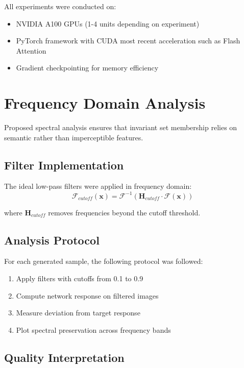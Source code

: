 \documentclass[licencjacka,en]{pracamgr}
\begin{document}
All experiments were conducted on:
\begin{itemize}
\item NVIDIA A100 GPUs (1-4 units depending on experiment)
\item PyTorch framework with CUDA most recent  acceleration such as Flash Attention \citep{dao2022flashattention, dao2023flashattention2}
\item Gradient checkpointing for memory efficiency
\end{itemize}

\section{Frequency Domain Analysis}\label{appendix:frequency_analysis}

Proposed spectral analysis ensures that invariant set membership relies on semantic rather than imperceptible features.

\subsection{Filter Implementation}

The ideal low-pass filters were applied in frequency domain:
\begin{equation}
\mathcal{F}_{cutoff}(\mathbf{x}) = \mathcal{F}^{-1}(\mathbf{H}_{cutoff} \cdot \mathcal{F}(\mathbf{x}))
\end{equation}

where $\mathbf{H}_{cutoff}$ removes frequencies beyond the cutoff threshold.

\subsection{Analysis Protocol}

For each generated sample, the following protocol was followed:
\begin{enumerate}
\item Apply filters with cutoffs from 0.1 to 0.9
\item Compute network response on filtered images
\item Measure deviation from target response
\item Plot spectral preservation across frequency bands
\end{enumerate}

\subsection{Quality Interpretation}
\end{document}
